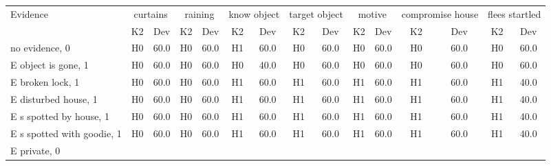 \begin{table}\begin{tabular}{l|cc|cc|cc|cc|cc|cc|cc}\toprule\multirow{2}{*}{Evidence} & \multicolumn{2}{c}{curtains}& \multicolumn{2}{c}{raining}& \multicolumn{2}{c}{know object}& \multicolumn{2}{c}{target object}& \multicolumn{2}{c}{motive}& \multicolumn{2}{c}{compromise house}& \multicolumn{2}{c}{flees startled}\\& {K2} & {Dev}& {K2} & {Dev}& {K2} & {Dev}& {K2} & {Dev}& {K2} & {Dev}& {K2} & {Dev}& {K2} & {Dev}\\\midrule
no evidence, 0 & \cellcolor{Bittersweet}H0&\cellcolor{Bittersweet}60.0&\cellcolor{Bittersweet}H0&\cellcolor{Bittersweet}60.0&\cellcolor{Bittersweet}H1&\cellcolor{Bittersweet}60.0&\cellcolor{Bittersweet}H0&\cellcolor{Bittersweet}60.0&\cellcolor{Bittersweet}H0&\cellcolor{Bittersweet}60.0&\cellcolor{Bittersweet}H0&\cellcolor{Bittersweet}60.0&\cellcolor{Bittersweet}H0&\cellcolor{Bittersweet}60.0\\E object is gone, 1 & \cellcolor{Bittersweet}H0&\cellcolor{Bittersweet}60.0&\cellcolor{Bittersweet}H0&\cellcolor{Bittersweet}60.0&\cellcolor{Bittersweet}H0&\cellcolor{Bittersweet}40.0&\cellcolor{Bittersweet}H0&\cellcolor{Bittersweet}60.0&\cellcolor{Bittersweet}H0&\cellcolor{Bittersweet}60.0&\cellcolor{Bittersweet}H0&\cellcolor{Bittersweet}60.0&\cellcolor{Bittersweet}H0&\cellcolor{Bittersweet}60.0\\E broken lock, 1 & \cellcolor{Bittersweet}H0&\cellcolor{Bittersweet}60.0&\cellcolor{Bittersweet}H0&\cellcolor{Bittersweet}60.0&\cellcolor{Bittersweet}H1&\cellcolor{Bittersweet}60.0&\cellcolor{Bittersweet}H1&\cellcolor{Bittersweet}60.0&\cellcolor{Bittersweet}H1&\cellcolor{Bittersweet}60.0&\cellcolor{Bittersweet}H1&\cellcolor{Bittersweet}60.0&\cellcolor{Bittersweet}H1&\cellcolor{Bittersweet}40.0\\E disturbed house, 1 & \cellcolor{Bittersweet}H0&\cellcolor{Bittersweet}60.0&\cellcolor{Bittersweet}H0&\cellcolor{Bittersweet}60.0&\cellcolor{Bittersweet}H1&\cellcolor{Bittersweet}60.0&\cellcolor{Bittersweet}H1&\cellcolor{Bittersweet}60.0&\cellcolor{Bittersweet}H1&\cellcolor{Bittersweet}60.0&\cellcolor{Bittersweet}H1&\cellcolor{Bittersweet}60.0&\cellcolor{Bittersweet}H1&\cellcolor{Bittersweet}40.0\\E s spotted by house, 1 & \cellcolor{Bittersweet}H0&\cellcolor{Bittersweet}60.0&\cellcolor{Bittersweet}H0&\cellcolor{Bittersweet}60.0&\cellcolor{Bittersweet}H1&\cellcolor{Bittersweet}60.0&\cellcolor{Bittersweet}H1&\cellcolor{Bittersweet}60.0&\cellcolor{Bittersweet}H1&\cellcolor{Bittersweet}60.0&\cellcolor{Bittersweet}H1&\cellcolor{Bittersweet}60.0&\cellcolor{Bittersweet}H1&\cellcolor{Bittersweet}40.0\\E s spotted with goodie, 1 & \cellcolor{Bittersweet}H0&\cellcolor{Bittersweet}60.0&\cellcolor{Bittersweet}H0&\cellcolor{Bittersweet}60.0&\cellcolor{Bittersweet}H1&\cellcolor{Bittersweet}60.0&\cellcolor{Bittersweet}H1&\cellcolor{Bittersweet}60.0&\cellcolor{Bittersweet}H1&\cellcolor{Bittersweet}60.0&\cellcolor{Bittersweet}H1&\cellcolor{Bittersweet}60.0&\cellcolor{Bittersweet}H1&\cellcolor{Bittersweet}40.0\\E private, 0 & 
\end{tabular}
\end{table}
